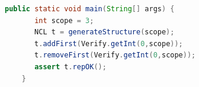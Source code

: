 \begin{lstlisting}[caption={Probando la propiedad \ref{alg:propiedad-a-chequear} con JPF},label={lst:driverNCLBuilders},language=Java,captionpos=b]
    public static void main(String[] args) {
       int scope = 3;
       NCL t = generateStructure(scope);
       t.addFirst(Verify.getInt(0,scope));
       t.removeFirst(Verify.getInt(0,scope));
       assert t.repOK();
    }
\end{lstlisting}
